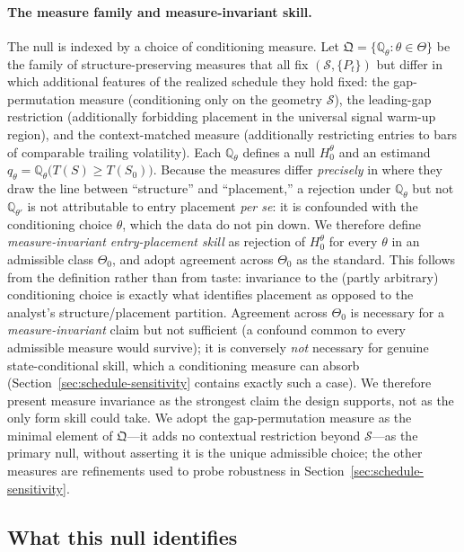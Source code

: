 \documentclass[preprint,12pt]{elsarticle}
\theoremstyle{definition}
\begin{document}
\paragraph{The measure family and measure-invariant skill.} The null is indexed by a choice of conditioning measure. Let $\mathfrak{Q}=\{\mathbb{Q}_\theta:\theta\in\Theta\}$ be the family of structure-preserving measures that all fix $(\mathcal S,\{P_t\})$ but differ in which additional features of the realized schedule they hold fixed: the gap-permutation measure (conditioning only on the geometry $\mathcal S$), the leading-gap restriction (additionally forbidding placement in the universal signal warm-up region), and the context-matched measure (additionally restricting entries to bars of comparable trailing volatility). Each $\mathbb{Q}_\theta$ defines a null $H_0^\theta$ and an estimand $q_\theta=\mathbb{Q}_\theta\big(T(S)\ge T(S_0)\big)$. Because the measures differ \emph{precisely} in where they draw the line between ``structure'' and ``placement,'' a rejection under $\mathbb{Q}_\theta$ but not $\mathbb{Q}_{\theta'}$ is not attributable to entry placement \emph{per se}: it is confounded with the conditioning choice $\theta$, which the data do not pin down. We therefore define \emph{measure-invariant entry-placement skill} as rejection of $H_0^\theta$ for every $\theta$ in an admissible class $\Theta_0$, and adopt agreement across $\Theta_0$ as the standard. This follows from the definition rather than from taste: invariance to the (partly arbitrary) conditioning choice is exactly what identifies placement as opposed to the analyst's structure/placement partition. Agreement across $\Theta_0$ is necessary for a \emph{measure-invariant} claim but not sufficient (a confound common to every admissible measure would survive); it is conversely \emph{not} necessary for genuine state-conditional skill, which a conditioning measure can absorb (Section~\ref{sec:schedule-sensitivity} contains exactly such a case). We therefore present measure invariance as the strongest claim the design supports, not as the only form skill could take. We adopt the gap-permutation measure as the minimal element of $\mathfrak{Q}$---it adds no contextual restriction beyond $\mathcal S$---as the primary null, without asserting it is the unique admissible choice; the other measures are refinements used to probe robustness in Section~\ref{sec:schedule-sensitivity}.

\subsection{What this null identifies}
\end{document}
